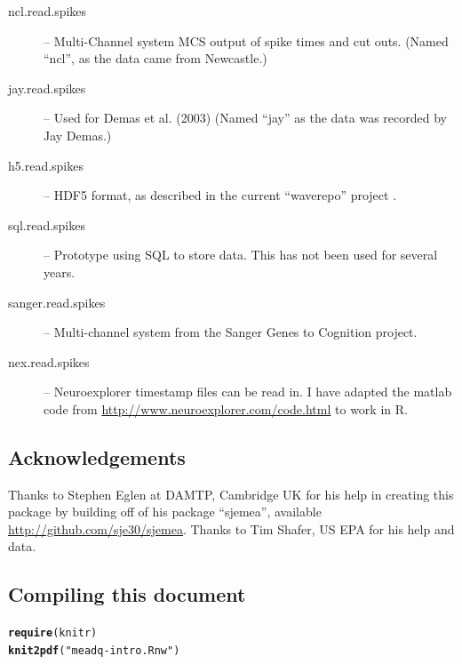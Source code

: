 \documentclass{article}\usepackage[]{graphicx}\usepackage[]{color}
\makeatletter
\newcommand{\hlstr}[1]{\textcolor[rgb]{0.192,0.494,0.8}{#1}}%
\newcommand{\hlstd}[1]{\textcolor[rgb]{0.345,0.345,0.345}{#1}}%
\newcommand{\hlkwd}[1]{\textcolor[rgb]{0.737,0.353,0.396}{\textbf{#1}}}%
\newenvironment{kframe}{%
 \def\at@end@of@kframe{}%
 \ifinner\ifhmode%
  \def\at@end@of@kframe{\end{minipage}}%
  \begin{minipage}{\columnwidth}%
 \fi\fi%
 \def\FrameCommand##1{\hskip\@totalleftmargin \hskip-\fboxsep
 \colorbox{shadecolor}{##1}\hskip-\fboxsep
     \hskip-\linewidth \hskip-\@totalleftmargin \hskip\columnwidth}%
 \MakeFramed {\advance\hsize-\width
   \@totalleftmargin\z@ \linewidth\hsize
   \@setminipage}}%
 {\par\unskip\endMakeFramed%
 \at@end@of@kframe}
\newenvironment{knitrout}{}{} %
\makeatother
\begin{document}
\begin{description}
\item[ncl.read.spikes]  -- Multi-Channel system MCS output of spike
  times and cut outs.  (Named ``ncl'', as the data came from Newcastle.)
\item[jay.read.spikes] -- Used for Demas et al. (2003)  (Named ``jay''
  as the data was recorded by Jay Demas.)
\item[h5.read.spikes] -- HDF5 format, as described in the current
  ``waverepo'' project \citep{Eglen2014}.
\item[sql.read.spikes] -- Prototype using SQL to store data.  This has
  not been used for several years.
\item[sanger.read.spikes] -- Multi-channel system from the Sanger
  Genes to Cognition project.
\item[nex.read.spikes] -- Neuroexplorer timestamp files can be read
  in.  I have adapted the matlab code from
  \url{http://www.neuroexplorer.com/code.html} to work in R.
\end{description}



\subsection*{Acknowledgements}
Thanks to Stephen Eglen at DAMTP, Cambridge UK for his help in creating this package by building off of his package ``sjemea'', available \url{http://github.com/sje30/sjemea}.  Thanks to Tim Shafer, US EPA for his help and data.





\subsection*{Compiling this document}

\begin{knitrout}
\color{fgcolor}\begin{kframe}
\begin{alltt}
\hlkwd{require}\hlstd{(knitr)}
\hlkwd{knit2pdf}\hlstd{(}\hlstr{"meadq-intro.Rnw"}\hlstd{)}
\end{alltt}
\end{kframe}
\end{knitrout}
\end{document}
